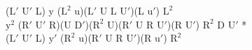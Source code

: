 ($\text{L}'$ $\text{U}'$ L) y ($\text{L}^2$ u)($\text{L}'$ U L $\text{U}'$)(L $\text{u}'$) $\text{L}^2$\\
$\text{y}^2$ ($\text{R}'$ $\text{U}'$ R)(U $\text{D}'$)($\text{R}^2$ U)($\text{R}'$ U R $\text{U}'$)(R $\text{U}'$) $\text{R}^2$ D $\text{U}'$ *\\
($\text{L}'$ $\text{U}'$ L) $\text{y}'$ ($\text{R}^2$ u)($\text{R}'$ U R $\text{U}'$)(R $\text{u}'$) $\text{R}^2$\\
